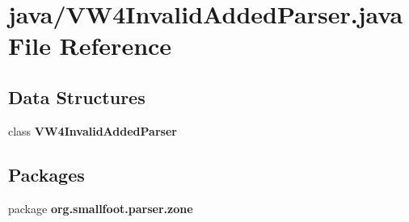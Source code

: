 \section{java/\+V\+W4\+Invalid\+Added\+Parser.java File Reference}
\label{VW4InvalidAddedParser_8java}
\subsection*{Data Structures}
\begin{DoxyCompactItemize}
\item 
class {\bf V\+W4\+Invalid\+Added\+Parser}
\end{DoxyCompactItemize}
\subsection*{Packages}
\begin{DoxyCompactItemize}
\item 
package {\bf org.\+smallfoot.\+parser.\+zone}
\end{DoxyCompactItemize}
